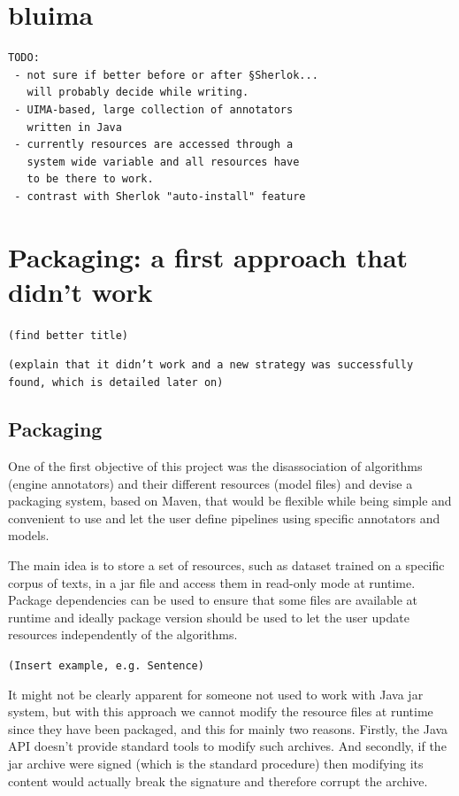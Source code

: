 \documentclass{article}
\newcommand{\TODO}[1]{\texttt{\textcolor{YellowOrange}{(#1)}}} %
\begin{document}
\section{bluima}

\begin{verbatim}
TODO:
 - not sure if better before or after §Sherlok...
   will probably decide while writing.
 - UIMA-based, large collection of annotators 
   written in Java
 - currently resources are accessed through a 
   system wide variable and all resources have
   to be there to work.
 - contrast with Sherlok "auto-install" feature
\end{verbatim}

\section{Packaging: a first approach that didn't work}

\TODO{find better title}

\TODO{explain that it didn't work and a new strategy was successfully found, which is detailed later on}

\subsection{Packaging}

One of the first objective of this project was the disassociation of algorithms (engine annotators) and their different resources (model files) and devise a packaging system, based on Maven, that would be flexible while being simple and convenient to use and let the user define pipelines using specific annotators and models.

The main idea is to store a set of resources, such as dataset trained on a specific corpus of texts, in a jar file and access them in read-only mode at runtime. Package dependencies can be used to ensure that some files are available at runtime and ideally package version should be used to let the user update resources independently of the algorithms.

\TODO{Insert example, e.g. Sentence}

It might not be clearly apparent for someone not used to work with Java jar system, but with this approach we cannot modify the resource files at runtime since they have been packaged, and this for mainly two reasons. Firstly, the Java API doesn't provide standard tools to modify such archives. And secondly, if the jar archive were signed (which is the standard procedure) then modifying its content would actually break the signature and therefore corrupt the archive.
\end{document}
